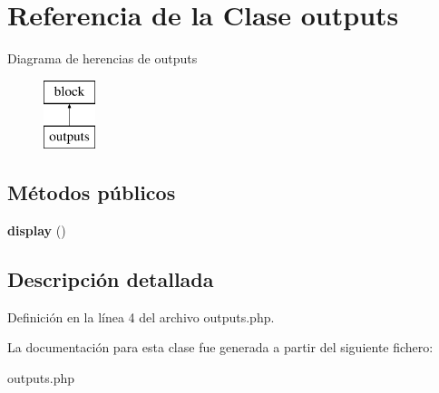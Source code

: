 \hypertarget{classoutputs}{\section{\-Referencia de la \-Clase outputs}
\label{classoutputs}
}
\-Diagrama de herencias de outputs\begin{figure}[H]
\begin{center}
\leavevmode
\includegraphics[height=2.000000cm]{classoutputs}
\end{center}
\end{figure}
\subsection*{\-Métodos públicos}
\begin{DoxyCompactItemize}
\item 
\hypertarget{classoutputs_ab48bb5d47938c85da5891c1250c18a5f}{{\bfseries display} ()}\label{classoutputs_ab48bb5d47938c85da5891c1250c18a5f}

\end{DoxyCompactItemize}


\subsection{\-Descripción detallada}


\-Definición en la línea 4 del archivo outputs.\-php.



\-La documentación para esta clase fue generada a partir del siguiente fichero\-:\begin{DoxyCompactItemize}
\item 
outputs.\-php\end{DoxyCompactItemize}
